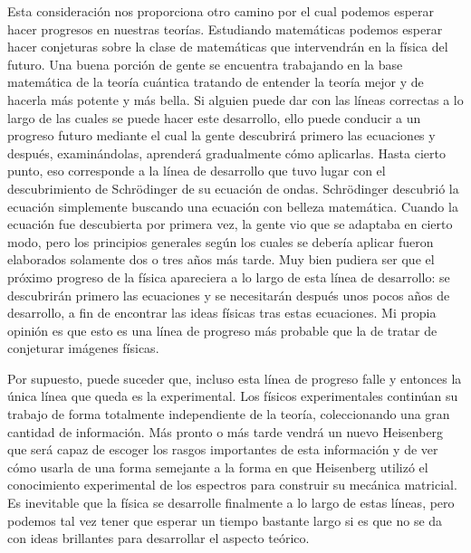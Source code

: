 \documentclass[a4paper, 12pt]{article}
\begin{document}
 Esta consideración nos proporciona otro camino por el cual podemos esperar hacer progresos en nuestras teorías. Estudiando matemáticas podemos esperar hacer conjeturas sobre la clase de matemáticas que intervendrán en la física del futuro. Una buena porción de gente se encuentra trabajando en la base matemática de la teoría cuántica tratando de entender la teoría mejor y de hacerla más potente y más bella. Si alguien puede dar con las líneas correctas a lo largo de las cuales se puede hacer este desarrollo, ello puede conducir a un progreso futuro mediante el cual la gente descubrirá primero las ecuaciones y después, examinándolas, aprenderá gradualmente cómo aplicarlas. Hasta cierto punto, eso corresponde a la línea de desarrollo que tuvo lugar con el descubrimiento de Schrödinger de su ecuación de ondas. Schrödinger descubrió la ecuación simplemente buscando una ecuación con belleza matemática. Cuando la ecuación fue descubierta por primera vez, la gente vio que se adaptaba en cierto modo, pero los principios generales según los cuales se debería aplicar fueron elaborados solamente dos o tres años más tarde. Muy bien pudiera ser que el próximo progreso de la física apareciera a lo largo de esta línea de desarrollo:
se descubrirán primero las ecuaciones y se necesitarán después unos pocos años de desarrollo, a fin de encontrar las ideas físicas tras estas ecuaciones. Mi propia opinión es que esto es una línea de progreso más probable que la de tratar de conjeturar imágenes físicas.

Por supuesto, puede suceder que, incluso esta línea de progreso falle y entonces la única línea que queda es la experimental. Los físicos experimentales continúan su trabajo de forma totalmente independiente de la teoría, coleccionando una gran cantidad de información. Más pronto o más tarde vendrá un nuevo Heisenberg que será capaz de escoger los rasgos importantes de esta información y de ver cómo usarla de una forma semejante a la forma en que Heisenberg utilizó el conocimiento experimental de los espectros para construir su mecánica matricial. Es inevitable que la física se desarrolle finalmente a lo largo de estas líneas, pero podemos tal vez tener que esperar un tiempo bastante largo si es que no se da con ideas brillantes para desarrollar el aspecto teórico.
\end{document}
